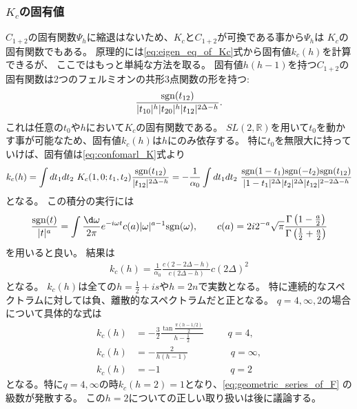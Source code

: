 \subsubsection{$K_c$の固有値}
$C_{1+2}$の固有関数$\Psi_h$に縮退はないため、$K_c$と$C_{1+2}$が可換である事から$\Psi_h$は
$K_c$の固有関数でもある。
原理的には\eqref{eq:eigen_eq_of_Kc}式から固有値$k_c(h)$を計算できるが、
ここではもっと単純な方法を取る。
固有値$h(h-1)$を持つ$C_{1+2}$の固有関数は2つのフェルミオンの共形3点関数の形を持つ:
\begin{align}
	\frac{\mathrm{sgn}(t_{12})}{|t_{10}|^h|t_{20}|^h|t_{12}|^{2\Delta - h}}.
\end{align}
これは任意の$t_0$や$h$において$K_c$の固有関数である。
$SL(2, \mathbb{R})$を用いて$t_0$を動かす事が可能なため、固有値$k_c(h)$は$h$にのみ依存する。
特に$t_0$を無限大に持っていけば、固有値は\eqref{eq:confomarl_K}式より
\begin{align}
	k_c(h)
	= \int dt_1 dt_2\ K_c(1, 0; t_1, t_2)\frac{\sgn(t_{12})}{|t_{12}|^{2\Delta - h}}
	= -\frac{1}{\alpha_0}\int dt_1dt_2\ 
	\frac{\sgn(1 - t_1)\sgn(-t_2)\sgn(t_{12})}
	{|1-t_1|^{2\Delta}|t_2|^{2\Delta}|t_{12}|^{2-2\Delta-h}}
\end{align}
となる。
この積分の実行には
\begin{align}
	\frac{\sgn(t)}{|t|^a} = \int\frac{\d\omega}{2\pi}
		e^{-i\omega t}c(a)|\omega|^{a-1}\sgn(\omega),\hspace{20pt}
		c(a) = 2i2^{-a}\sqrt{\pi}
		\frac{\Gamma\left(1-\frac{a}{2}\right)}{\Gamma\left(\frac{1}{2}+\frac{a}{2}\right)}
\end{align}
を用いると良い。
結果は
\begin{align}
	k_c(h) = \frac{1}{\alpha_0}\frac{c(2-2\Delta-h)}{c(2\Delta-h)}c(2\Delta)^2
	\label{eq:eigenvalue_of_Kc}
\end{align}
となる。
$k_c(h)$は全ての$h = \frac{1}{2} + is$や$h = 2n$で実数となる。
特に連続的なスペクトラムに対しては負、離散的なスペクトラムだと正となる。
$q = 4, \infty, 2$の場合について具体的な式は
\begin{align}
	k_c(h) &= -\frac{3}{2}\frac{\tan\frac{\pi(h - 1/2)}{2}}{h - \frac{1}{2}}
	\hspace{30pt}q = 4,\\
	k_c(h) &= -\frac{2}{h(h-1)}
	\hspace{53pt}q = \infty,\\
	k_c(h) &= -1
	\hspace{87pt}q = 2
\end{align}
となる。特に$q = 4, \infty$の時$k_c(h=2) = 1$となり、\eqref{eq:geometric_series_of_F}
の級数が発散する。
この$h = 2$についての正しい取り扱いは後に議論する。

